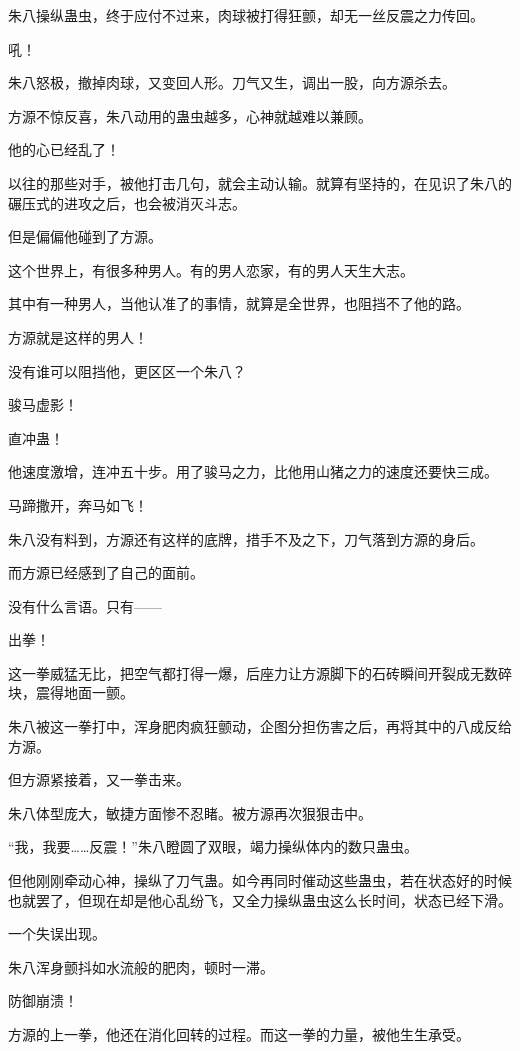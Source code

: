 \begin{this_body}
朱八操纵蛊虫，终于应付不过来，肉球被打得狂颤，却无一丝反震之力传回。

吼！

朱八怒极，撤掉肉球，又变回人形。刀气又生，调出一股，向方源杀去。

方源不惊反喜，朱八动用的蛊虫越多，心神就越难以兼顾。

他的心已经乱了！

以往的那些对手，被他打击几句，就会主动认输。就算有坚持的，在见识了朱八的碾压式的进攻之后，也会被消灭斗志。

但是偏偏他碰到了方源。

这个世界上，有很多种男人。有的男人恋家，有的男人天生大志。

其中有一种男人，当他认准了的事情，就算是全世界，也阻挡不了他的路。

方源就是这样的男人！

没有谁可以阻挡他，更区区一个朱八？

骏马虚影！

直冲蛊！

他速度激增，连冲五十步。用了骏马之力，比他用山猪之力的速度还要快三成。

马蹄撒开，奔马如飞！

朱八没有料到，方源还有这样的底牌，措手不及之下，刀气落到方源的身后。

而方源已经感到了自己的面前。

没有什么言语。只有——

出拳！

这一拳威猛无比，把空气都打得一爆，后座力让方源脚下的石砖瞬间开裂成无数碎块，震得地面一颤。

朱八被这一拳打中，浑身肥肉疯狂颤动，企图分担伤害之后，再将其中的八成反给方源。

但方源紧接着，又一拳击来。

朱八体型庞大，敏捷方面惨不忍睹。被方源再次狠狠击中。

“我，我要……反震！”朱八瞪圆了双眼，竭力操纵体内的数只蛊虫。

但他刚刚牵动心神，操纵了刀气蛊。如今再同时催动这些蛊虫，若在状态好的时候也就罢了，但现在却是他心乱纷飞，又全力操纵蛊虫这么长时间，状态已经下滑。

一个失误出现。

朱八浑身颤抖如水流般的肥肉，顿时一滞。

防御崩溃！

方源的上一拳，他还在消化回转的过程。而这一拳的力量，被他生生承受。


\end{this_body}

